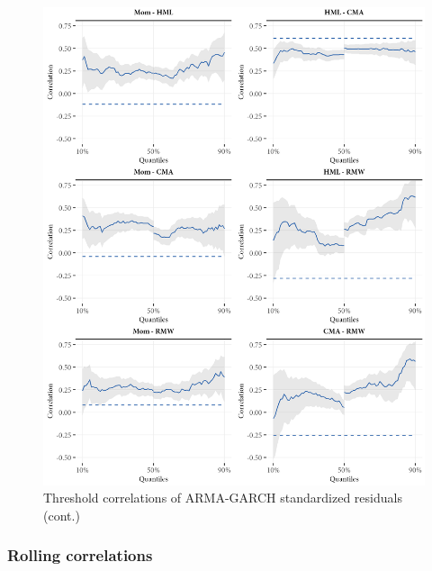 \begin{figure}[H]
  \ContinuedFloat
  \centering
  \includegraphics[scale=1]{graphics/threshold2.png}
  \footnotesize
  \caption{Threshold correlations of ARMA-GARCH standardized residuals (cont.)}
\end{figure}

\subsubsection{Rolling correlations}

